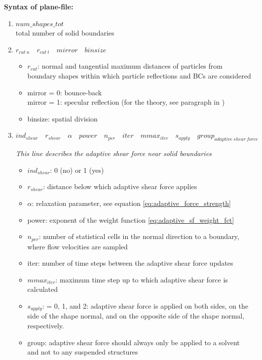\documentclass[a4paper,10pt]{scrreprt}
\begin{document}
\textbf{Syntax of plane-file:}
\begin{enumerate}
\item $num\_shapes\_tot$\\
total number of solid boundaries

\item $  r_{cut\ n} \quad   r_{cut\ t} \quad   mirror \quad   binsize$

	\begin{itemize}
	\item $ r_{cut}$: normal and tangential maximum distances of particles from boundary shapes within which particle reflections and BCs are considered
	\item mirror = 0: bounce-back\\ mirror = 1: specular reflection (for the theory, see paragraph in )
	\item binsize: spatial division
	\end{itemize}

\item $ind_{shear} \quad   r_{shear} \quad   \alpha \quad   power \quad   n_{per} \quad   iter \quad   mmax_{iter} \quad   s_{apply} \quad   group_{adaptive\ shear\ force}$

	{\em This line describes the adaptive shear force near solid boundaries}
	\begin{itemize}
	\item $ ind_{shear}$: 0 (no) or 1 (yes)
	\item $ r_{shear}$: distance below which adaptive shear force applies
	\item $\alpha$: relaxation parameter, see equation \eqref{eq:adaptive_force_strength}
	\item power: exponent of the weight function \eqref{eq:adaptive_sf_weight_fct}
	\item $ n_{per}$: number of statistical cells in the normal direction to a boundary, where flow velocities are sampled
	\item iter: number of time steps between the adaptive shear force updates
	\item $ mmax_{iter}$: maximum time step up to which adaptive shear force is calculated
	\item $ s_{apply}$: = 0, 1, and 2: adaptive shear force is applied on both sides, on the side of the shape normal, and on the opposite side of the shape normal, respectively.
	\item group: adaptive shear force should always only be applied to a solvent and not to any suspended structures
	\end{itemize}


\end{enumerate}
\end{document}
